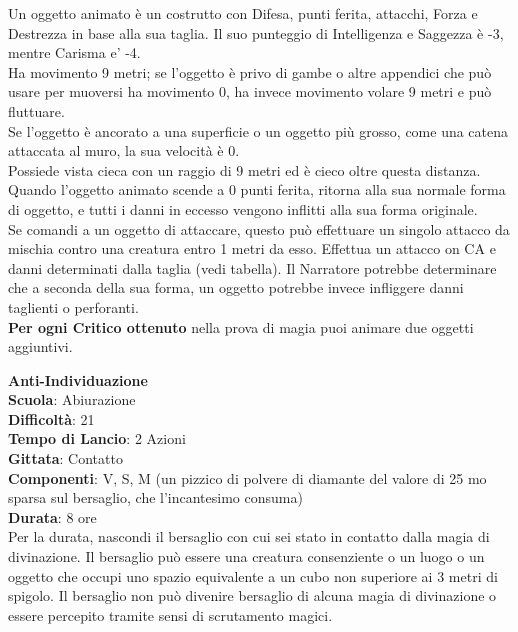\bigskip

\begin{multicols}{2}

Un oggetto animato è un costrutto con Difesa, punti ferita, attacchi, Forza e Destrezza in base alla sua taglia. Il suo punteggio di Intelligenza e Saggezza è -3, mentre Carisma e' -4.\\
Ha movimento 9 metri; se l'oggetto è privo di gambe o altre appendici che può usare per muoversi ha movimento 0, ha invece movimento volare 9 metri e può fluttuare. 
\\Se l'oggetto è ancorato a una superficie o un oggetto più grosso, come una catena attaccata al muro, la sua velocità è 0.\\
Possiede vista cieca con un raggio di 9 metri ed è cieco oltre questa distanza.\\
Quando l'oggetto animato scende a 0 punti ferita, ritorna alla sua normale forma di oggetto, e tutti i danni in eccesso vengono inflitti alla sua forma originale.\\
Se comandi a un oggetto di attaccare, questo può effettuare un singolo attacco da mischia contro una creatura entro 1 metri da esso. Effettua un attacco on CA e danni determinati dalla taglia (vedi tabella). Il Narratore potrebbe determinare che a seconda della sua forma, un oggetto potrebbe invece infliggere danni taglienti o perforanti.\\
\textbf{Per ogni Critico ottenuto} nella prova di magia puoi animare due oggetti aggiuntivi.

\medskip\textbf{Anti-Individuazione}\\
\textbf{Scuola}: Abiurazione\\
\textbf{Difficoltà}: 21\\
\textbf{Tempo di Lancio}: 2 Azioni\\
\textbf{Gittata}: Contatto\\
\textbf{Componenti}: V, S, M (un pizzico di polvere di diamante del valore di 25 mo sparsa sul bersaglio, che l'incantesimo consuma)\\
\textbf{Durata}: 8 ore\\
Per la durata, nascondi il bersaglio con cui sei stato in contatto dalla magia di divinazione. Il bersaglio può essere una creatura consenziente o un luogo o un oggetto che occupi uno spazio equivalente a un cubo non superiore ai 3 metri di spigolo. Il bersaglio non può divenire bersaglio di alcuna magia di divinazione o essere percepito tramite sensi di scrutamento magici.


\end{multicols}
